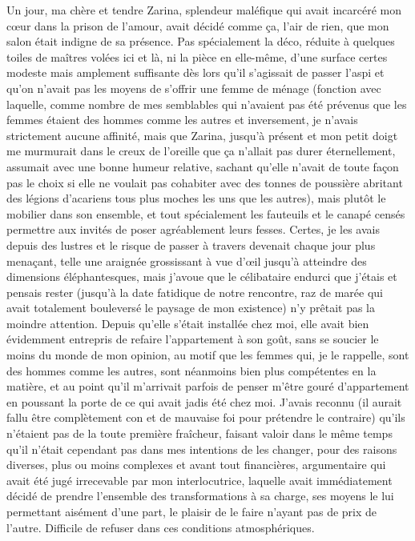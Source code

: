 Un jour, ma chère et tendre Zarina, splendeur maléfique qui avait incarcéré mon cœur dans la prison de l’amour, avait décidé comme ça, l’air de rien, que mon salon était indigne de sa présence. Pas spécialement la déco, réduite à quelques toiles de maîtres volées ici et là, ni la pièce en elle-même, d’une surface certes modeste mais amplement suffisante dès lors qu’il s’agissait de passer l’aspi et qu’on n’avait pas les moyens de s’offrir une femme de ménage (fonction avec laquelle, comme nombre de mes semblables qui n’avaient pas été prévenus que les femmes étaient des hommes comme les autres et inversement, je n’avais strictement aucune affinité, mais que Zarina, jusqu’à présent et mon petit doigt me murmurait dans le creux de l’oreille que ça n’allait pas durer éternellement, assumait avec une bonne humeur relative, sachant qu’elle n’avait de toute façon pas le choix si elle ne voulait pas cohabiter avec des tonnes de poussière abritant des légions d’acariens tous plus moches les uns que les autres), mais plutôt le mobilier dans son ensemble, et tout spécialement les fauteuils et le canapé censés permettre aux invités de poser agréablement leurs fesses. Certes, je les avais depuis des lustres et le risque de passer à travers devenait chaque jour plus menaçant, telle une araignée grossissant à vue d’œil jusqu’à atteindre des dimensions éléphantesques, mais j’avoue que le célibataire endurci que j’étais et pensais rester (jusqu’à la date fatidique de notre rencontre, raz de marée qui avait totalement bouleversé le paysage de mon existence) n’y prêtait pas la moindre attention. Depuis qu’elle s’était installée chez moi, elle avait bien évidemment entrepris de refaire l’appartement à son goût, sans se soucier le moins du monde de mon opinion, au motif que les femmes qui, je le rappelle, sont des hommes comme les autres, sont néanmoins bien plus compétentes en la matière, et au point qu’il m’arrivait parfois de penser m’être gouré d’appartement en poussant la porte de ce qui avait jadis été chez moi. J’avais reconnu (il aurait fallu être complètement con et de mauvaise foi pour prétendre le contraire) qu’ils n’étaient pas de la toute première fraîcheur, faisant valoir dans le même temps qu’il n’était cependant pas dans mes intentions de les changer, pour des raisons diverses, plus ou moins complexes et avant tout financières, argumentaire qui avait été jugé irrecevable par mon interlocutrice, laquelle avait immédiatement décidé de prendre l’ensemble des transformations à sa charge, ses moyens le lui permettant aisément d’une part, le plaisir de le faire n’ayant pas de prix de l’autre. Difficile de refuser dans ces conditions atmosphériques.

